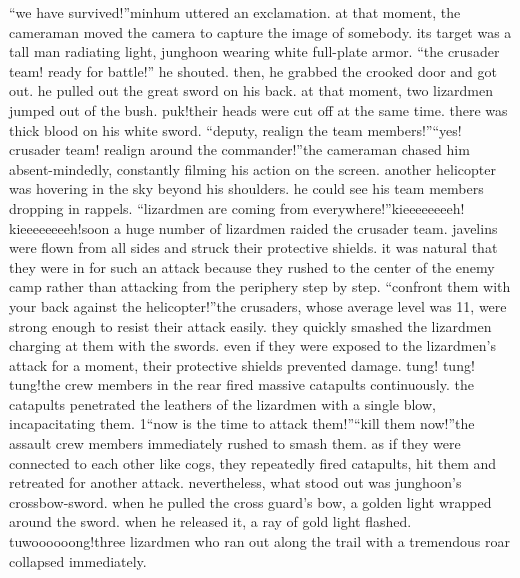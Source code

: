 “we have survived!”minhum uttered an exclamation.
 at that moment, the cameraman moved the camera to capture the image of somebody.
 its target was a tall man radiating light, junghoon wearing white full-plate armor.
“the crusader team! ready for battle!” he shouted.
then, he grabbed the crooked door and got out.
 he pulled out the great sword on his back.
 at that moment, two lizardmen jumped out of the bush.
puk!their heads were cut off at the same time.
 there was thick blood on his white sword.
“deputy, realign the team members!”“yes! crusader team! realign around the commander!”the cameraman chased him absent-mindedly, constantly filming his action on the screen.
another helicopter was hovering in the sky beyond his shoulders.
 he could see his team members dropping in rappels.
“lizardmen are coming from everywhere!”kieeeeeeeeh! kieeeeeeeeh!soon a huge number of lizardmen raided the crusader team.
 javelins were flown from all sides and struck their protective shields.
 it was natural that they were in for such an attack because they rushed to the center of the enemy camp rather than attacking from the periphery step by step.
“confront them with your back against the helicopter!”the crusaders, whose average level was 11, were strong enough to resist their attack easily.
they quickly smashed the lizardmen charging at them with the swords.
even if they were exposed to the lizardmen’s attack for a moment, their protective shields prevented damage.
tung! tung! tung!the crew members in the rear fired massive catapults continuously.
 the catapults penetrated the leathers of the lizardmen with a single blow, incapacitating them.
1“now is the time to attack them!”“kill them now!”the assault crew members immediately rushed to smash them.
 as if they were connected to each other like cogs, they repeatedly fired catapults, hit them and retreated for another attack.
nevertheless, what stood out was junghoon’s crossbow-sword.
 when he pulled the cross guard’s bow, a golden light wrapped around the sword.
 when he released it, a ray of gold light flashed.
tuwoooooong!three lizardmen who ran out along the trail with a tremendous roar collapsed immediately.


